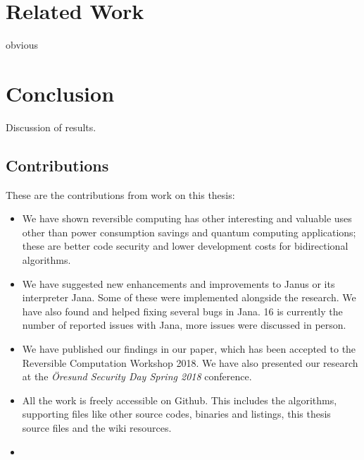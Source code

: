 \documentclass[a4paper,10pt,openright]{memoir}
\newcommand{\term}[1]{\textit{#1}}
\begin{document}
\chapter{Related Work}

obvious

\chapter{Conclusion}

Discussion of results.

\section{Contributions}

These are the contributions from work on this thesis:

\begin{itemize}

\item We have shown reversible computing has other interesting and 
valuable uses other than power consumption savings and quantum 
computing applications; these are better code security and lower 
development costs for bidirectional algorithms.

\item We have suggested new enhancements and improvements to Janus or 
its interpreter Jana. Some of these were implemented alongside the 
research. We have also found and helped fixing several bugs in Jana. 16 
is currently the number of reported issues with Jana, more issues were 
discussed in person.

\item We have published our findings in our paper\cite{revcry-paper}, which 
has been accepted to the Reversible Computation Workshop 2018. We have 
also presented our research at the \term{Öresund Security Day Spring 
2018} conference.

\item All the work is freely accessible on 
Github\cite{revcry-github}. This includes the algorithms, 
supporting files like other source codes, binaries and listings, this 
thesis source files and the wiki resources.

\item {}

\end{itemize}



\end{document}
